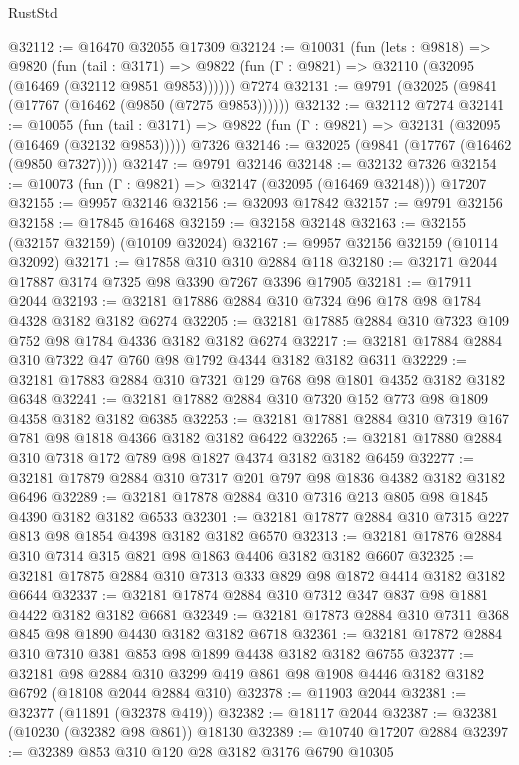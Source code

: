 \begin{lexlean}{RustStd}
\begin{coremodule}
@32112 := @16470 @32055 @17309
@32124 := @10031
    (fun (lets : @9818) =>
    @9820
      (fun (tail : @3171) =>
      @9822 (fun (Γ : @9821) => @32110 (@32095 (@16469 (@32112 @9851 @9853))))))
    @7274
@32131 := @9791 (@32025 (@9841 (@17767 (@16462 (@9850 (@7275 @9853))))))
@32132 := @32112 @7274
@32141 := @10055
    (fun (tail : @3171) => @9822 (fun (Γ : @9821) => @32131 (@32095 (@16469 (@32132 @9853)))))
    @7326
@32146 := @32025 (@9841 (@17767 (@16462 (@9850 @7327))))
@32147 := @9791 @32146
@32148 := @32132 @7326
@32154 := @10073 (fun (Γ : @9821) => @32147 (@32095 (@16469 @32148))) @17207
@32155 := @9957 @32146
@32156 := @32093 @17842
@32157 := @9791 @32156
@32158 := @17845 @16468
@32159 := @32158 @32148
@32163 := @32155 (@32157 @32159) (@10109 @32024)
@32167 := @9957 @32156 @32159 (@10114 @32092)
@32171 := @17858 @310 @310 @2884 @118
@32180 := @32171 @2044 @17887 @3174 @7325 @98 @3390 @7267 @3396 @17905
@32181 := @17911 @2044
@32193 := @32181 @17886 @2884 @310 @7324 @96 @178 @98 @1784 @4328 @3182 @3182 @6274
@32205 := @32181 @17885 @2884 @310 @7323 @109 @752 @98 @1784 @4336 @3182 @3182 @6274
@32217 := @32181 @17884 @2884 @310 @7322 @47 @760 @98 @1792 @4344 @3182 @3182 @6311
@32229 := @32181 @17883 @2884 @310 @7321 @129 @768 @98 @1801 @4352 @3182 @3182 @6348
@32241 := @32181 @17882 @2884 @310 @7320 @152 @773 @98 @1809 @4358 @3182 @3182 @6385
@32253 := @32181 @17881 @2884 @310 @7319 @167 @781 @98 @1818 @4366 @3182 @3182 @6422
@32265 := @32181 @17880 @2884 @310 @7318 @172 @789 @98 @1827 @4374 @3182 @3182 @6459
@32277 := @32181 @17879 @2884 @310 @7317 @201 @797 @98 @1836 @4382 @3182 @3182 @6496
@32289 := @32181 @17878 @2884 @310 @7316 @213 @805 @98 @1845 @4390 @3182 @3182 @6533
@32301 := @32181 @17877 @2884 @310 @7315 @227 @813 @98 @1854 @4398 @3182 @3182 @6570
@32313 := @32181 @17876 @2884 @310 @7314 @315 @821 @98 @1863 @4406 @3182 @3182 @6607
@32325 := @32181 @17875 @2884 @310 @7313 @333 @829 @98 @1872 @4414 @3182 @3182 @6644
@32337 := @32181 @17874 @2884 @310 @7312 @347 @837 @98 @1881 @4422 @3182 @3182 @6681
@32349 := @32181 @17873 @2884 @310 @7311 @368 @845 @98 @1890 @4430 @3182 @3182 @6718
@32361 := @32181 @17872 @2884 @310 @7310 @381 @853 @98 @1899 @4438 @3182 @3182 @6755
@32377 := @32181
    @98
    @2884
    @310
    @3299
    @419
    @861
    @98
    @1908
    @4446
    @3182
    @3182
    @6792
    (@18108 @2044 @2884 @310)
@32378 := @11903 @2044
@32381 := @32377 (@11891 (@32378 @419))
@32382 := @18117 @2044
@32387 := @32381 (@10230 (@32382 @98 @861)) @18130
@32389 := @10740 @17207 @2884
@32397 := @32389 @853 @310 @120 @28 @3182 @3176 @6790 @10305

\end{coremodule}
\end{lexlean}
